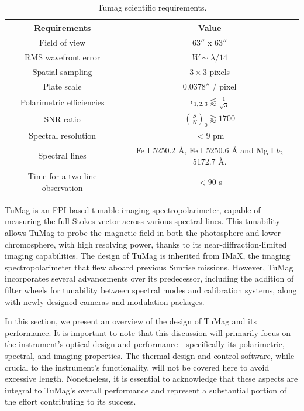 \begin{table}
    \centering
   \begin{tabular}{cc}
    \hline
    \hline
    Requirements & Value \\
    \hline
    Field of view & $63''$ x $63''$ \\
    RMS wavefront error & $W \sim \lambda / 14$\\
    Spatial sampling & $3 \times 3 $ pixels \\
    Plate scale & $0.0378''$ / pixel \\
    Polarimetric efficiencies & $\epsilon _ {1, 2, 3} \lessapprox \frac{1}{\sqrt{3}}$\\
    SNR ratio & $\left(\frac{S}{N}\right) _ 0 \gtrapprox 1700$ \\
    Spectral resolution & $< 9$ pm\\  
    Spectral lines & Fe I 5250.2 \r{A}, Fe I 5250.6 \r{A} and Mg I $b_2$ 5172.7 \r{A}. \\
    Time for a two-line observation & $< 90$ s\\
    \hline
    \hline
    \end{tabular}
    \caption{Tumag scientific requirements.}
    \label{table: Tumags requirements}
\end{table}

TuMag is an FPI-based tunable imaging spectropolarimeter, capable of measuring the full Stokes vector across various spectral lines. This tunability allows TuMag to probe the magnetic field in both the photosphere and lower chromosphere, with high resolving power, thanks to its near-diffraction-limited imaging capabilities. The design of TuMag is inherited from IMaX, the imaging spectropolarimeter that flew aboard previous Sunrise missions. However, TuMag incorporates several advancements over its predecessor, including the addition of filter wheels for tunability between spectral modes and calibration systems, along with newly designed cameras and modulation packages.

In this section, we present an overview of the design of TuMag  and its performance. It is important to note that this discussion will primarily focus on the instrument's optical design and performance—specifically its polarimetric, spectral, and imaging properties. The thermal design and control software, while crucial to the instrument’s functionality, will not be covered here to avoid excessive length. Nonetheless, it is essential to acknowledge that these aspects are integral to TuMag’s overall performance and represent a substantial portion of the effort contributing to its success.

